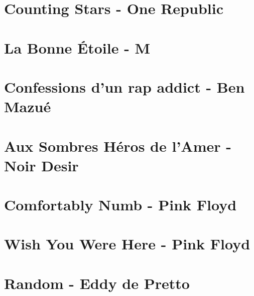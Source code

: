 \documentclass{guitartabs}
\begin{document}
\section{Counting Stars - One Republic}
\begin{guitar}

\end{guitar}

\section{La Bonne Étoile - M}
\begin{guitar}

\end{guitar}

\section{Confessions d'un rap addict - Ben Mazué}
\begin{guitar}

\end{guitar}

\section{Aux Sombres Héros de l'Amer - Noir Desir}
\begin{guitar}

\end{guitar}



\section{Comfortably Numb - Pink Floyd}
\begin{guitar}

\end{guitar}

\section{Wish You Were Here - Pink Floyd}
\begin{guitar}

\end{guitar}


\section{Random - Eddy de Pretto}
\begin{guitar}

\end{guitar}
\end{document}
